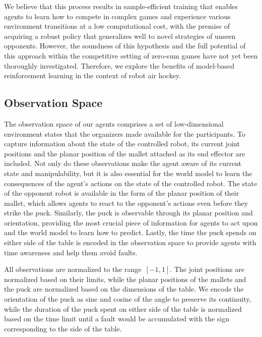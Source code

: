 \documentclass{article}
\begin{document}
We believe that this process results in sample-efficient training that enables agents to learn how to compete in complex games and experience various environment transitions at a low computational cost, with the premise of acquiring a robust policy that generalizes well to novel strategies of unseen opponents. However, the soundness of this hypothesis and the full potential of this approach within the competitive setting of zero-sum games have not yet been thoroughly investigated. Therefore, we explore the benefits of model-based reinforcement learning in the context of robot air hockey.

\subsection{Observation Space}\label{ssec:observation-space}

The observation space of our agents comprises a set of low-dimensional environment states that the organizers made available for the participants. To capture information about the state of the controlled robot, its current joint positions and the planar position of the mallet attached as its end effector are included. Not only do these observations make the agent aware of its current state and manipulability, but it is also essential for the world model to learn the consequences of the agent's actions on the state of the controlled robot. The state of the opponent robot is available in the form of the planar position of their mallet, which allows agents to react to the opponent's actions even before they strike the puck. Similarly, the puck is observable through its planar position and orientation, providing the most crucial piece of information for agents to act upon and the world model to learn how to predict. Lastly, the time the puck spends on either side of the table is encoded in the observation space to provide agents with time awareness and help them avoid faults.

All observations are normalized to the range~\([-1, 1]\). The joint positions are normalized based on their limits, while the planar positions of the mallets and the puck are normalized based on the dimensions of the table. We encode the orientation of the puck as sine and cosine of the angle to preserve its continuity, while the duration of the puck spent on either side of the table is normalized based on the time limit until a fault would be accumulated with the sign corresponding to the side of the table.
\end{document}
